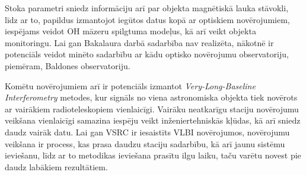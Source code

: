 

Stoka parametri sniedz informāciju arī par objekta magnētiskā lauka stāvokli, līdz ar to, papildus izmantojot iegūtos datus kopā ar optiskiem novērojumiem, iespējams veidot OH māzeru spilgtuma modeļus, kā arī veikt objekta monitoringu. Lai gan Bakalaura darbā sadarbība nav realizēta, nākotnē ir potenciāls veidot minēto sadarbību ar kādu optisko novērojumu observatoriju, piemēram, Baldones observatoriju.

Komētu novērojumiem arī ir potenciāls izmantot \textit{Very-Long-Baseline Interferometry} metodes, kur signāls no viena astronomiska objekta tiek novērots ar vairākiem radioteleskopiem vienlaicīgi. Vairāku neatkarīgu staciju novērojumu veikšana vienlaicīgi samazina iespēju veikt inženiertehniskās kļūdas, kā arī sniedz daudz vairāk datu. Lai gan VSRC ir iesaistīts VLBI novērojumos, novērojumu veikšana ir process, kas prasa daudzu staciju sadarbību, kā arī jaunu sistēmu ieviešanu, līdz ar to metodikas ieviešana prasītu ilgu laiku, taču varētu novest pie daudz labākiem rezultātiem.

